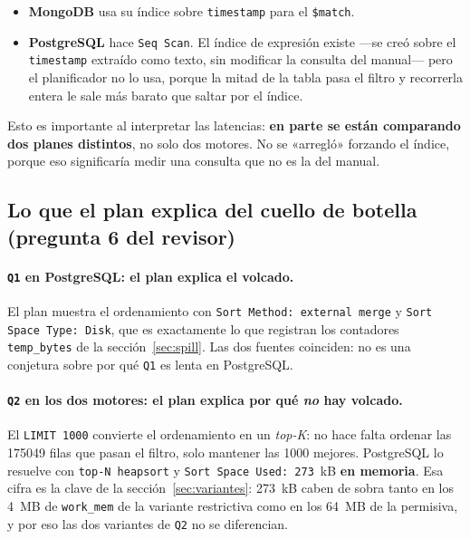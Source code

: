 \begin{itemize}
  \item \textbf{MongoDB} usa su índice sobre \texttt{timestamp} para el
        \texttt{\$match}.
  \item \textbf{PostgreSQL} hace \texttt{Seq Scan}. El índice de expresión existe
        —se creó sobre el \texttt{timestamp} extraído como texto, sin modificar la
        consulta del manual— pero el planificador no lo usa, porque la mitad de la
        tabla pasa el filtro y recorrerla entera le sale más barato que saltar por
        el índice.
\end{itemize}

Esto es importante al interpretar las latencias: \textbf{en parte se están
comparando dos planes distintos}, no solo dos motores. No se «arregló» forzando
el índice, porque eso significaría medir una consulta que no es la del manual.

\subsection{Lo que el plan explica del cuello de botella (pregunta 6 del revisor)}

\paragraph{\texttt{Q1} en PostgreSQL: el plan explica el volcado.}
El plan muestra el ordenamiento con \texttt{Sort Method: external merge} y
\texttt{Sort Space Type: Disk}, que es exactamente lo que registran los
contadores \texttt{temp\_bytes} de la sección~\ref{sec:spill}. Las dos fuentes
coinciden: no es una conjetura sobre por qué \texttt{Q1} es lenta en PostgreSQL.

\paragraph{\texttt{Q2} en los dos motores: el plan explica por qué \emph{no} hay volcado.}
El \texttt{LIMIT 1000} convierte el ordenamiento en un \emph{top-K}: no hace falta
ordenar las \num{175049} filas que pasan el filtro, solo mantener las 1000
mejores. PostgreSQL lo resuelve con \texttt{top-N heapsort} y
\texttt{Sort Space Used: 273}~kB \textbf{en memoria}. Esa cifra es la clave de la
sección~\ref{sec:variantes}: 273~kB caben de sobra tanto en los 4~MB de
\texttt{work\_mem} de la variante restrictiva como en los 64~MB de la permisiva,
y por eso las dos variantes de \texttt{Q2} no se diferencian.
